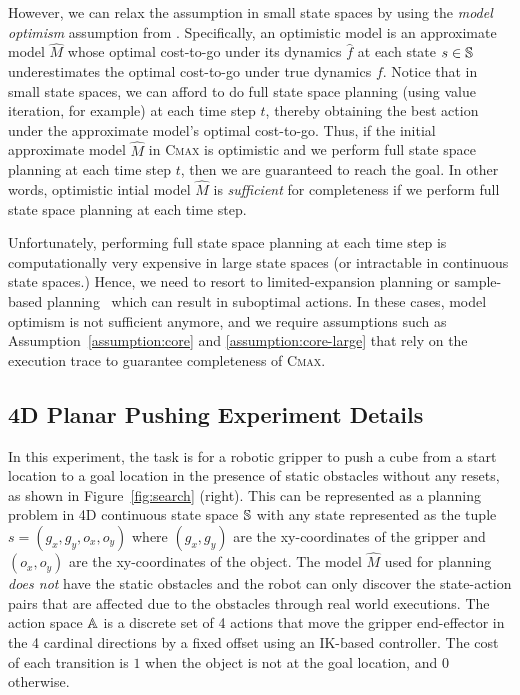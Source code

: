 However, we can relax the assumption in small state spaces by using the
\textit{model optimism} assumption from
\citet{DBLP:conf/aaai/Jiang18}. Specifically, an optimistic model is an
approximate model $\hat{M}$ whose optimal cost-to-go under its dynamics
$\hat{f}$ at each state $s \in \mathbb{S}$ underestimates the optimal
cost-to-go under true dynamics $f$. Notice that in small state spaces,
we can afford to do full state space planning (using value iteration,
for example) at each time step $t$, thereby obtaining the best action
under the approximate model's optimal cost-to-go. Thus, if the initial
approximate model $\hat{M}$ in \textsc{Cmax} is optimistic and we
perform full state space planning at each time step $t$, then we are
guaranteed to reach the goal. In other words, optimistic intial model
$\hat{M}$ is \textit{sufficient} for completeness if we perform full
state space planning at each time step.

Unfortunately, performing full state space planning at each time step
is computationally very expensive in large state spaces (or
intractable in continuous state spaces.) Hence, we need to resort to
limited-expansion planning or sample-based
planning~\cite{DBLP:journals/ml/KearnsMN02} which can result in
suboptimal actions. In these cases, model optimism is not sufficient
anymore, and we require assumptions such as
Assumption~\ref{assumption:core} and \ref{assumption:core-large} that
rely on the execution trace to guarantee completeness of \textsc{Cmax}.

\subsection{4D Planar Pushing Experiment Details}
\label{sec:4d-planar-pushing}

In this experiment, the task is for a robotic gripper to push a cube
from a start location to a goal location in the presence of
static obstacles without any resets, as shown in
Figure~\ref{fig:search} (right). This can be represented as a
planning problem in 4D continuous state space $\mathbb{S}$ with any state represented as
the tuple $s = (g_x,
g_y, o_x, o_y)$ where $(g_x, g_y)$ are the xy-coordinates of the
gripper and $(o_x, o_y)$ are the xy-coordinates of the object. The
model $\hat{M}$ used for planning \textit{does not} have the static obstacles and the
robot can only discover the state-action pairs that are affected due
to the obstacles through real world executions. The
action space $\mathbb{A}$ is a discrete set of 4 actions that move
the gripper end-effector in the 4 cardinal directions by a fixed
offset using an IK-based controller. The cost of each transition is
$1$ when the object is not at the goal location, and $0$
otherwise.

